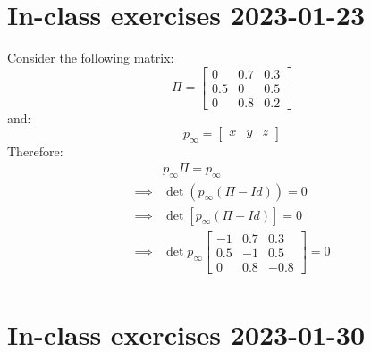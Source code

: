 \documentclass{article}
\newcommand{\1}{\mathbf{1}}
\begin{document}
\section{In-class exercises 2023-01-23}
Consider the following matrix:
$$
  \Pi =
  \begin{bmatrix}
    0   & 0.7 & 0.3 \\
    0.5 & 0   & 0.5 \\
    0   & 0.8 & 0.2
  \end{bmatrix}
$$
and:
$$
  p_\infty =
  \begin{bmatrix}
    x & y & z
  \end{bmatrix}
$$
Therefore:
\begin{align*}
           & p_\infty \Pi = p_\infty       \\
  \implies &
  \det(p_\infty (\Pi - Id)) = 0            \\
  \implies &
  \det\left[p_\infty (\Pi - Id)\right] = 0 \\
  \implies &
  \det p_\infty
  \begin{bmatrix}
    -1  & 0.7 & 0.3  \\
    0.5 & -1  & 0.5  \\
    0   & 0.8 & -0.8
  \end{bmatrix}
  = 0                                      \\
\end{align*}

\section{In-class exercises 2023-01-30}
\end{document}
